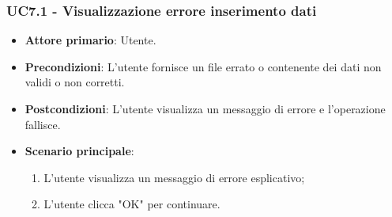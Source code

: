 \subsubsection{UC7.1 - Visualizzazione errore inserimento dati}
\begin{itemize}
	\item \textbf{Attore primario}: Utente.
	\item \textbf{Precondizioni}: L'utente fornisce un file errato o contenente dei dati non validi o non corretti.
	\item \textbf{Postcondizioni}: L'utente visualizza un messaggio di errore e l'operazione fallisce.
	\item \textbf{Scenario principale}:
		\begin{enumerate}
			\item L'utente visualizza un messaggio di errore esplicativo;
			\item L'utente clicca "OK" per continuare.
		\end{enumerate}
\end{itemize}